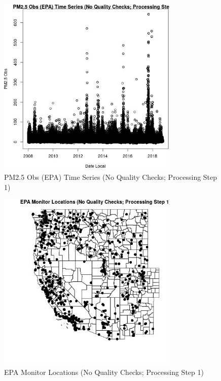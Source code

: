 
\begin{figure} 
\centering  
\includegraphics[width=0.77\textwidth]{Code_Outputs/PM25Source1TSstep1_PM25_ObsvDate_Local.jpg} 
\caption{\label{fig:PM25Source1TSstep1PM25_ObsvDate_Local}PM2.5 Obs (EPA) Time Series (No Quality Checks; Processing Step 1)} 
\end{figure} 
 

\begin{figure} 
\centering  
\includegraphics[width=0.77\textwidth]{Code_Outputs/PM25Source1TSstep1_MapEPALocations.jpg} 
\caption{\label{fig:PM25Source1TSstep1MapEPALocations}EPA Monitor Locations (No Quality Checks; Processing Step 1)} 
\end{figure} 
 

